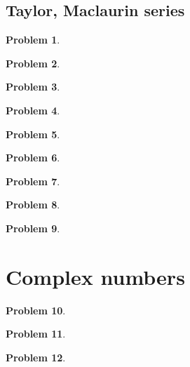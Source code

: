 \documentclass{article}
\newtheorem{problem}{Problem}
\begin{document}
\subsection{Taylor, Maclaurin series}
\begin{problem}

\end{problem}
\begin{problem}

\end{problem}
\begin{problem}

\end{problem}
\begin{problem}

\end{problem}

\begin{problem}

\end{problem}

\begin{problem}

\end{problem}


\begin{problem}

\end{problem}


\begin{problem}

\end{problem}


\begin{problem}

\end{problem}
\section{Complex numbers}
\begin{problem}

\end{problem}

\begin{problem}

\end{problem}
\begin{problem}

\end{problem}
\end{document}
